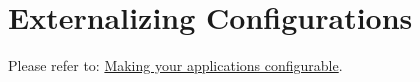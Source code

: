 \section{Externalizing Configurations}

Please refer to: \href{https://dev.liferay.com/develop/tutorials/-/knowledge_base/7-0/making-your-applications-configurable}{Making your applications configurable}.